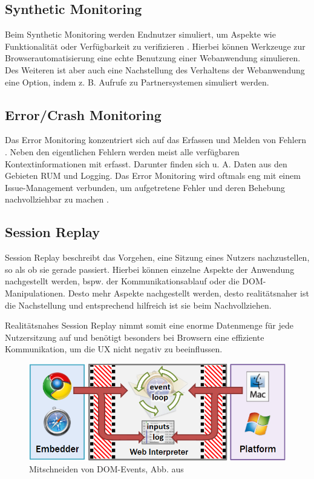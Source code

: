 \subsection{Synthetic Monitoring}

Beim Synthetic Monitoring werden Endnutzer simuliert, um Aspekte wie Funktionalität oder Verfügbarkeit zu verifizieren \cite{IdentifyingWebPerformanceDegradations}. Hierbei können Werkzeuge zur Browserautomatisierung eine echte Benutzung einer Webanwendung simulieren. Des Weiteren ist aber auch eine Nachstellung des Verhaltens der Webanwendung eine Option, indem z. B. Aufrufe zu Partnersystemen simuliert werden.

\subsection{Error/Crash Monitoring}

Das Error Monitoring konzentriert sich auf das Erfassen und Melden von Fehlern \cite{CrashbinCrashMonitoring}. Neben den eigentlichen Fehlern werden meist alle verfügbaren Kontextinformationen mit erfasst. Darunter finden sich u. A. Daten aus den Gebieten RUM und Logging. Das Error Monitoring wird oftmals eng mit einem Issue-Management verbunden, um aufgetretene Fehler und deren Behebung nachvollziehbar zu machen \cite{CrashbinCrashMonitoring}.

\subsection{Session Replay}

Session Replay beschreibt das Vorgehen, eine Sitzung eines Nutzers nachzustellen, so als ob sie gerade passiert. Hierbei können einzelne Aspekte der Anwendung nachgestellt werden, bspw. der Kommunikationsablauf oder die DOM-Manipulationen. Desto mehr Aspekte nachgestellt werden, desto realitätsnaher ist die Nachstellung und entsprechend hilfreich ist sie beim Nachvollziehen.

Realitätsnahes Session Replay nimmt somit eine enorme Datenmenge für jede Nutzersitzung auf und benötigt besonders bei Browsern eine effiziente Kommunikation, um die UX nicht negativ zu beeinflussen.

\begin{figure}
\centering
\includegraphics[width=\linewidth]{img/03_methoden/timelapse_figure5.png}
\caption{Mitschneiden von DOM-Events, Abb. aus \cite{TimelapsePaper}}
\label{fig:timelapse_figure5}
\end{figure}

